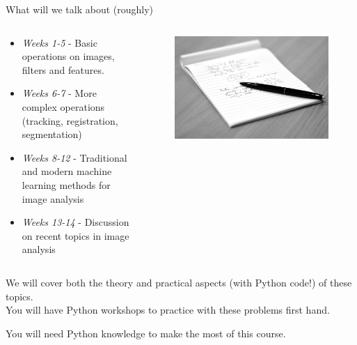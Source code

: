 \documentclass[9pt, aspectratio=169]{beamer}
\begin{document}
\begin{frame}
    {What will we talk about (roughly)}
    \begin{columns}
        \begin{column}{0.7\textwidth}
            \begin{itemize}
                \item \textit{Weeks 1-5} - Basic operations on images, filters and features.
                \item \textit{Weeks 6-7} - More complex operations (tracking, registration, segmentation)
                \item \textit{Weeks 8-12} - Traditional and modern machine learning methods for image analysis
                \item \textit{Weeks 13-14} - Discussion on recent topics in image analysis
            \end{itemize}
        \end{column}
        \begin{column}{0.3\textwidth}
            \begin{figure}
                \includegraphics[width=\textwidth]{notes.jpg}
                \caption{\color{gray}{Matt Cornock - CC BY-NC 2.0}}
            \end{figure}
        \end{column}
    \end{columns}
    \pause

    We will cover both the theory and practical aspects (with Python code!) of these topics.\\
    You will have Python workshops to practice with these problems first hand.

    \pause

    You will need Python knowledge to make the most of this course.
\end{frame}
\end{document}
